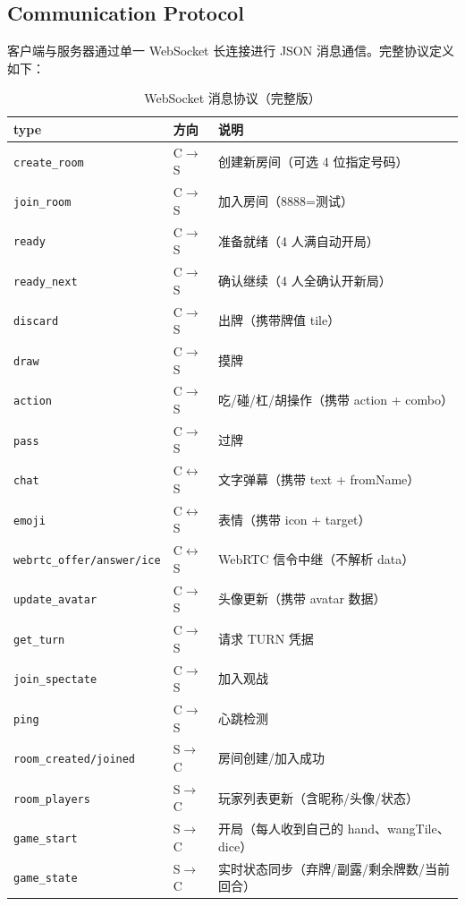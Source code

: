 \documentclass[11pt,a4paper]{article}
\begin{document}
\subsection{Communication Protocol}

客户端与服务器通过单一 WebSocket 长连接进行 JSON 消息通信。完整协议定义如下：

\begin{table}[H]
\centering
\caption{WebSocket 消息协议（完整版）}
\label{tab:protocol}
\footnotesize
\begin{tabular}{@{}llp{5.5cm}@{}}
\toprule
\textbf{type} & \textbf{方向} & \textbf{说明} \\
\midrule
\texttt{create\_room} & C$\to$S & 创建新房间（可选 4 位指定号码） \\
\texttt{join\_room} & C$\to$S & 加入房间（8888=测试） \\
\texttt{ready} & C$\to$S & 准备就绪（4 人满自动开局） \\
\texttt{ready\_next} & C$\to$S & 确认继续（4 人全确认开新局） \\
\texttt{discard} & C$\to$S & 出牌（携带牌值 tile） \\
\texttt{draw} & C$\to$S & 摸牌 \\
\texttt{action} & C$\to$S & 吃/碰/杠/胡操作（携带 action + combo） \\
\texttt{pass} & C$\to$S & 过牌 \\
\texttt{chat} & C$\leftrightarrow$S & 文字弹幕（携带 text + fromName） \\
\texttt{emoji} & C$\leftrightarrow$S & 表情（携带 icon + target） \\
\texttt{webrtc\_offer/answer/ice} & C$\leftrightarrow$S & WebRTC 信令中继（不解析 data） \\
\texttt{update\_avatar} & C$\to$S & 头像更新（携带 avatar 数据） \\
\texttt{get\_turn} & C$\to$S & 请求 TURN 凭据 \\
\texttt{join\_spectate} & C$\to$S & 加入观战 \\
\texttt{ping} & C$\to$S & 心跳检测 \\
\midrule
\texttt{room\_created/joined} & S$\to$C & 房间创建/加入成功 \\
\texttt{room\_players} & S$\to$C & 玩家列表更新（含昵称/头像/状态） \\
\texttt{game\_start} & S$\to$C & 开局（每人收到自己的 hand、wangTile、dice） \\
\texttt{game\_state} & S$\to$C & 实时状态同步（弃牌/副露/剩余牌数/当前回合） \\

\end{tabular}
\end{table}
\end{document}
